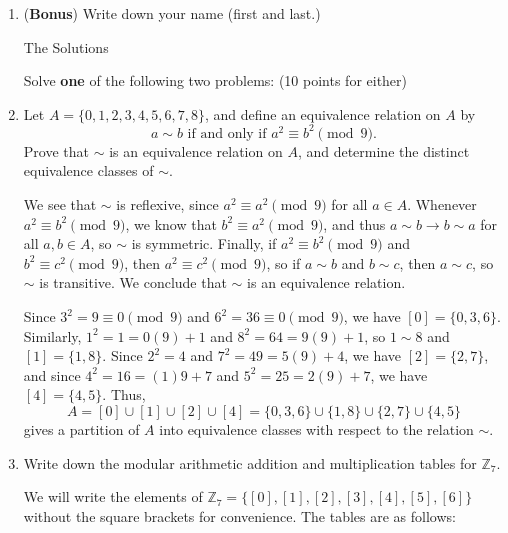 \documentclass[12pt]{article}
\newcommand{\points}[1]{\marginpar{\hspace{24pt}[#1]}}
\newcommand{\Z}{\mathbb{Z}}
\begin{document}
\thispagestyle{fancy}

\bigskip


\begin{enumerate}
 \item ({\bf Bonus}) Write down your name (first and last.) \points{1}

\bigskip

The Solutions

\bigskip

Solve {\bf one} of the following two problems: (10 points for either)

 \item Let $A=\{0,1,2,3,4,5,6,7,8\}$, and define an equivalence relation on $A$ by\points{10}
\[
 a\sim b \text{ if and only if } a^2\equiv b^2\pmod{9}.
\]
 Prove that $\sim$ is an equivalence relation on $A$, and determine the distinct equivalence classes of $\sim$.

\bigskip

We see that $\sim$ is reflexive, since $a^2\equiv a^2\pmod{9}$ for all $a\in A$. Whenever $a^2\equiv b^2\pmod{9}$, we know that $b^2\equiv a^2\pmod{9}$, and thus $a\sim b\to b\sim a$ for all $a,b\in A$, so $\sim$ is symmetric. Finally, if $a^2\equiv b^2\pmod{9}$ and $b^2\equiv c^2\pmod{9}$, then $a^2\equiv c^2\pmod{9}$, so if $a\sim b$ and $b\sim c$, then $a\sim c$, so $\sim$ is transitive. We conclude that $\sim$ is an equivalence relation.

Since $3^2=9\equiv 0\pmod{9}$ and $6^2=36\equiv 0\pmod{9}$, we have $[0] = \{0,3,6\}$. Similarly, $1^2=1=0(9)+1$ and $8^2=64 = 9(9)+1$, so $1\sim 8$ and $[1]=\{1,8\}$. Since $2^2=4$ and $7^2=49=5(9)+4$, we have $[2]=\{2,7\}$, and since $4^2=16=(1)9+7$ and $5^2=25=2(9)+7$, we have $[4]=\{4,5\}$. Thus,
\[
 A = [0]\cup[1]\cup [2]\cup [4] = \{0,3,6\}\cup\{1,8\}\cup\{2,7\}\cup\{4,5\}
\]
gives a partition of $A$ into equivalence classes with respect to the relation $\sim$.

\bigskip

 \item Write down the modular arithmetic addition and multiplication tables for $\Z_7$.\points{10}

We will write the elements of $\Z_7 = \{[0],[1],[2],[3],[4],[5],[6]\}$ without the square brackets for convenience. The tables are as follows:
\end{enumerate}
\end{document}
